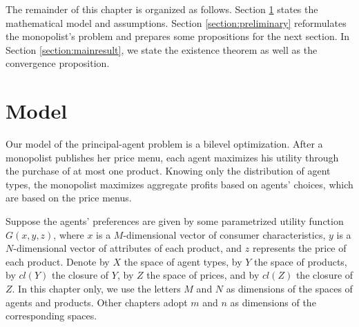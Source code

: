 The remainder of this chapter is organized as follows. Section \ref{section:model} states the mathematical model and assumptions. Section \ref{section:preliminary} reformulates the monopolist's problem and prepares some propositions for the next section. In Section \ref{section:mainresult}, we state the existence theorem as well as the convergence proposition. %


 


\section{Model}\label{section:model}



Our model of the principal-agent problem is a bilevel optimization. After a monopolist publishes her price menu, each agent maximizes his utility through the purchase of at most one product. Knowing only the distribution of agent types, the monopolist maximizes aggregate profits based on agents' choices, which are based on the price menus.\medskip


Suppose the agents' preferences are given by some parametrized utility function  $G(x, y, z)$, where $x$ is a $M$-dimensional vector of consumer characteristics, $y$ is a $N$-dimensional vector of attributes of each product, and $z$ represents the price of each product. Denote by $X$ the space of agent types, by $Y$ the space of products, by $cl(Y)$ the closure of $Y$, by $Z$ the space of prices, and by $cl(Z)$ the closure of $Z$. In this chapter only, we use the letters $M$ and $N$ as dimensions of the spaces of agents and products. Other chapters adopt $m$ and $n$ as dimensions of the corresponding spaces. \medskip

